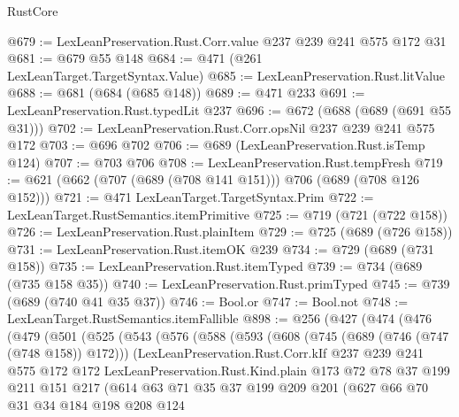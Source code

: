 \begin{lexlean}{RustCore}
\begin{coremodule}
@679 := LexLeanPreservation.Rust.Corr.value @237 @239 @241 @575 @172 @31
@681 := @679 @55 @148
@684 := @471 (@261 LexLeanTarget.TargetSyntax.Value)
@685 := LexLeanPreservation.Rust.litValue
@688 := @681 (@684 (@685 @148))
@689 := @471 @233
@691 := LexLeanPreservation.Rust.typedLit @237
@696 := @672 (@688 (@689 (@691 @55 @31)))
@702 := LexLeanPreservation.Rust.Corr.opsNil @237 @239 @241 @575 @172
@703 := @696 @702
@706 := @689 (LexLeanPreservation.Rust.isTemp @124)
@707 := @703 @706
@708 := LexLeanPreservation.Rust.tempFresh
@719 := @621 (@662 (@707 (@689 (@708 @141 @151))) @706 (@689 (@708 @126 @152)))
@721 := @471 LexLeanTarget.TargetSyntax.Prim
@722 := LexLeanTarget.RustSemantics.itemPrimitive
@725 := @719 (@721 (@722 @158))
@726 := LexLeanPreservation.Rust.plainItem
@729 := @725 (@689 (@726 @158))
@731 := LexLeanPreservation.Rust.itemOK @239
@734 := @729 (@689 (@731 @158))
@735 := LexLeanPreservation.Rust.itemTyped
@739 := @734 (@689 (@735 @158 @35))
@740 := LexLeanPreservation.Rust.primTyped
@745 := @739 (@689 (@740 @41 @35 @37))
@746 := Bool.or
@747 := Bool.not
@748 := LexLeanTarget.RustSemantics.itemFallible
@898 := @256
    (@427
      (@474
        (@476
          (@479
            (@501
              (@525
                (@543
                  (@576
                    (@588
                      (@593
                        (@608
                          (@745 (@689 (@746 (@747 (@748 @158)) @172)))
                          (LexLeanPreservation.Rust.Corr.kIf
                            @237
                            @239
                            @241
                            @575
                            @172
                            @172
                            LexLeanPreservation.Rust.Kind.plain
                            @173
                            @72
                            @78
                            @37
                            @199
                            @211
                            @151
                            @217
                            (@614
                              @63
                              @71
                              @35
                              @37
                              @199
                              @209
                              @201
                              (@627
                                @66
                                @70
                                @31
                                @34
                                @184
                                @198
                                @208
                                @124

\end{coremodule}
\end{lexlean}
